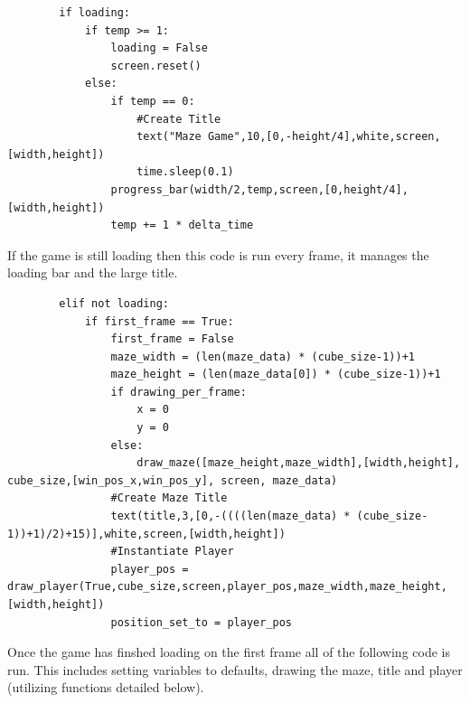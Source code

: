 \begin{lstlisting}
        if loading:
            if temp >= 1:
                loading = False
                screen.reset()
            else:
                if temp == 0:
                    #Create Title
                    text("Maze Game",10,[0,-height/4],white,screen,[width,height])
                    time.sleep(0.1)
                progress_bar(width/2,temp,screen,[0,height/4],[width,height])  
                temp += 1 * delta_time    
\end{lstlisting}
If the game is still loading then this code is run every frame, it manages the loading bar and the large title.

\clearpage
\begin{lstlisting}
        elif not loading:                                               
            if first_frame == True:                
                first_frame = False            
                maze_width = (len(maze_data) * (cube_size-1))+1
                maze_height = (len(maze_data[0]) * (cube_size-1))+1
                if drawing_per_frame:
                    x = 0
                    y = 0
                else:
                    draw_maze([maze_height,maze_width],[width,height], cube_size,[win_pos_x,win_pos_y], screen, maze_data)
                #Create Maze Title
                text(title,3,[0,-((((len(maze_data) * (cube_size-1))+1)/2)+15)],white,screen,[width,height])
                #Instantiate Player
                player_pos = draw_player(True,cube_size,screen,player_pos,maze_width,maze_height,[width,height])  
                position_set_to = player_pos
\end{lstlisting}
Once the game has finshed loading on the first frame all of the following code is run. This includes setting variables to defaults, drawing the maze, title and player (utilizing functions detailed below).

